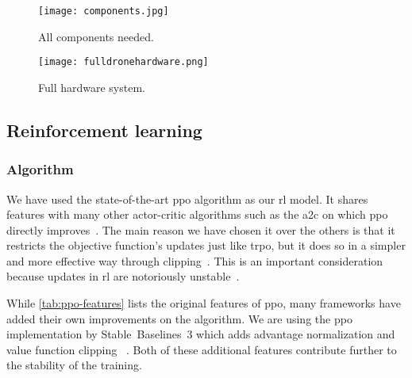 \documentclass[../main.tex]{subfiles}
\begin{document}
\begin{figure}[p]
	\centering
	\texttt{[image: components.jpg]}
	\caption{All components needed.}
	\label{fig:components}
\end{figure}

\begin{figure}[h]
	\centering
	\texttt{[image: fulldronehardware.png]}
	\caption{Full hardware system.}
	\label{fig:full-hardware}
\end{figure}  



\subsection{Reinforcement learning}

\subsubsection{Algorithm}

We have used the state-of-the-art \gls{ppo} algorithm as our \gls{rl}
model. 
It shares features with many other actor-critic algorithms such
as the \gls{a2c} on which \gls{ppo} directly improves~\cite{ppo}.
The main reason we have chosen it over the others is that it restricts
the objective function's updates just like \gls{trpo}, but it does so
in a simpler and more effective way through clipping~\cite{ppo}.
This is an important consideration because updates in \gls{rl} are
notoriously unstable~\cite{Hen18}. 

While \cref{tab:ppo-features} lists the original features of \gls{ppo},
many frameworks have added their own improvements on the algorithm.
We are using the \gls{ppo} implementation by Stable~Baselines~3
which adds advantage normalization and value function clipping%
~\cite{sb3}.
Both of these additional features contribute further to the stability
of the training.
\end{document}
